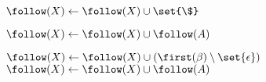 
\begin{algorithm}[H]
\begin{algorithmic}[1]
    \pause
      
      \State $\follow(X) \gets \follow(X) \cup \set{\$}$
    \EndFor

    \pause
    \hStatex
     
      \State $\follow(X) \gets \follow(X) \cup \follow(A)$
    \EndFor

    \pause
    \hStatex
     
      \State $\follow(X) \gets \follow(X) \cup (\first(\beta) \setminus \set{\epsilon})$
      \If{\red{$\epsilon \in \first(\beta)$}}
        \State $\follow(X) \gets \follow(X) \cup \follow(A)$
      \EndIf
    \EndFor
  \EndProcedure
\end{algorithmic}
\end{algorithm}